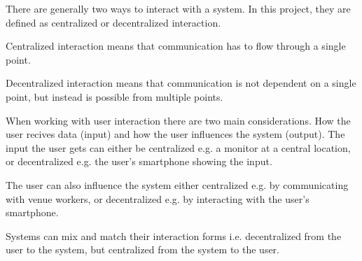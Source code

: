 There are generally two ways to interact with a system. In this project, they are defined as centralized or decentralized interaction.

Centralized interaction means that communication has to flow through a single point.

Decentralized interaction means that communication is not dependent on a single point, but instead is possible from multiple points.



When working with user interaction there are two main considerations. How the user recives data (input) and how the user influences the system (output). The input the user gets can either be centralized e.g. a monitor at a central location, or decentralized e.g. the user's smartphone showing the input.

The user can also influence the system either centralized e.g. by communicating with venue workers, or decentralized e.g. by interacting with the user's smartphone.

Systems can mix and match their interaction forms i.e. decentralized from the user to the system, but centralized from the system to the user.


